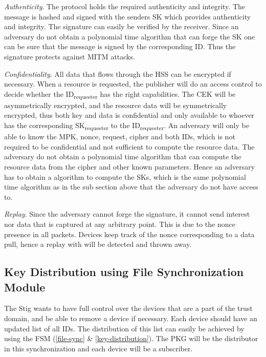 \textit{Authenticity}.
The protocol holds the required authenticity and integrity. 
The message is hashed and signed with the senders \gls{SK} which provides authenticity and integrity.
The signature can easily be verified by the receiver.
Since an adversary do not obtain a polynomial time algorithm that can forge the \gls{SK} one can be sure that the message is signed by the corresponding ID.
Thus the signature protects against \gls{MITM} attacks.

\textit{Confidentiality}. 
All \gls{data} that flows through the \gls{HSS} can be encrypted if necessary. 
When a resource is requested, the \gls{publisher} will do an access control to decide whether the ID\textsubscript{requester} has the right capabilities. 
The \gls{CEK} will be asymmetrically encrypted, and the resource data will be symmetrically encrypted, thus both key and data is confidential and only available to whoever has the corresponding \gls{SK}\textsubscript{requester} to the ID\textsubscript{requester}.
An adversary will only be able to know the \gls{MPK}, nonce, request, cipher and both IDs, which is not required to be confidential and not sufficient to compute the resource data. 
The adversary do not obtain a polynomial time algorithm that can compute the resource data from the cipher and other known parameters.
Hence an adversary has to obtain a algorithm to compute the \gls{SK}s, which is the same polynomial time algorithm as in the sub section above that the adversary do not have access to.

\textit{Replay}.
Since the adversary cannot forge the signature, it cannot send \gls{interest} nor \gls{data} that is captured at any arbitrary point. 
This is due to the nonce presence in all packets. 
Devices keep track of the nonce corresponding to a data pull, hence a replay with will be detected and thrown away.

\subsection{Key Distribution using File Synchronization Module}

The Stig wants to have full control over the devices that are a part of the trust domain, and be able to remove a device if necessary.
Each device should have an updated list of all \gls{ID}s.
The distribution of this list can easily be achieved by using the \gls{FSM} (\autoref{file-sync} \& \autoref{key-distribution}).
The \gls{PKG} will be the distributor in this synchronization and each device will be a subscriber.


